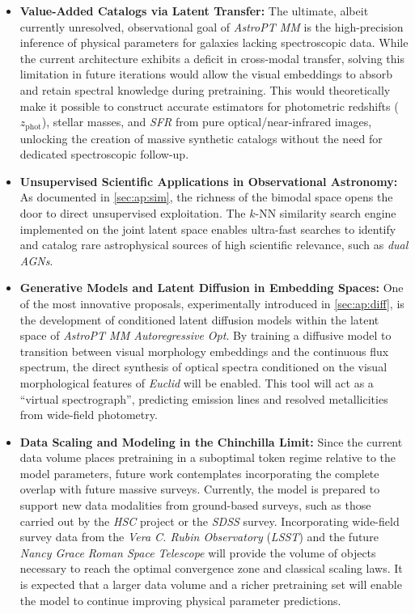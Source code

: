 \begin{itemize}
	\item \textbf{Value-Added Catalogs via Latent Transfer:} 
	The ultimate, albeit currently unresolved, observational goal of \textit{AstroPT MM} is the high-precision inference of physical parameters for galaxies lacking spectroscopic data. While the current architecture exhibits a deficit in cross-modal transfer, solving this limitation in future iterations would allow the visual embeddings to absorb and retain spectral knowledge during pretraining. This would theoretically make it possible to construct accurate estimators for photometric redshifts ($z_{\text{phot}}$), stellar masses, and \textit{\gls{SFR}} from pure optical/near-infrared images, unlocking the creation of massive synthetic catalogs without the need for dedicated spectroscopic follow-up.
	
	\item \textbf{Unsupervised Scientific Applications in Observational Astronomy:} 
	As documented in \cref{sec:ap:sim}, the richness of the bimodal space opens the door to direct unsupervised exploitation. The $k$-NN similarity search engine implemented on the joint latent space enables ultra-fast searches to identify and catalog rare astrophysical sources of high scientific relevance, such as \textit{dual \glspl{AGN}}.
	
	\item \textbf{Generative Models and Latent Diffusion in Embedding Spaces:} 
	One of the most innovative proposals, experimentally introduced in \cref{sec:ap:diff}, is the development of conditioned latent diffusion models within the latent space of \textit{AstroPT MM Autoregressive Opt}. By training a diffusive model to transition between visual morphology embeddings and the continuous flux spectrum, the direct synthesis of optical spectra conditioned on the visual morphological features of \textit{Euclid} will be enabled. This tool will act as a ``virtual spectrograph'', predicting emission lines and resolved metallicities from wide-field photometry.
	
	\item \textbf{Data Scaling and Modeling in the Chinchilla Limit:} 
	Since the current data volume places pretraining in a suboptimal token regime relative to the model parameters, future work contemplates incorporating the complete overlap with future massive surveys. Currently, the model is prepared to support new data modalities from ground-based surveys, such as those carried out by the \textit{\gls{HSC}} project or the \textit{\gls{SDSS}} survey. Incorporating wide-field survey data from the \textit{Vera C. Rubin Observatory} (\textit{\gls{LSST}}) and the future \textit{Nancy Grace Roman Space Telescope} will provide the volume of objects necessary to reach the optimal convergence zone and classical scaling laws. It is expected that a larger data volume and a richer pretraining set will enable the model to continue improving physical parameter predictions.
	

\end{itemize}
